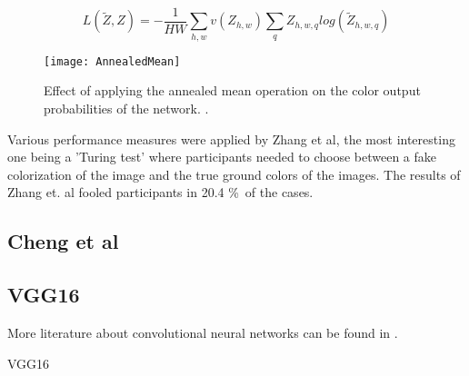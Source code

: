 \begin{equation}
L(\widetilde{Z},Z)=-\frac{1}{HW}\sum_{h,w}v(Z_{h,w})\sum_q^{}{Z_{h,w,q}log({\widetilde{Z}_{h,w,q}})}
\label{eq:lossZhang}
\end{equation}

\begin{figure}[h]
\centering
	\texttt{[image: AnnealedMean]}
\centering
\caption{Effect of applying the annealed mean operation on the  color output probabilities of the network. \cite{yu2015multi}.}
\label{fig:anmean}
\end{figure}

Various performance measures were applied by Zhang et al, the most interesting one being a 'Turing test' where participants needed to choose between a fake colorization of the image and the true ground colors of the images. The results of Zhang et. al fooled participants in 20.4 \%\ of the cases. 



\subsection{Cheng et al}

\subsection{VGG16}




More literature about convolutional neural networks can be found in \cite{GoodfellowBOOK}. 


%

VGG16




